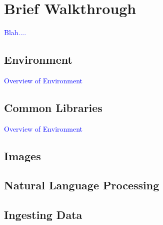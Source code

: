 \chapter{Brief Walkthrough}

\textcolor{blue}{Blah....}

\section{Environment}

\textcolor{blue}{Overview of Environment}















\section{Common Libraries}

\textcolor{blue}{Overview of Environment}




\section{Images}



\section{Natural Language Processing}




\section{Ingesting Data}








